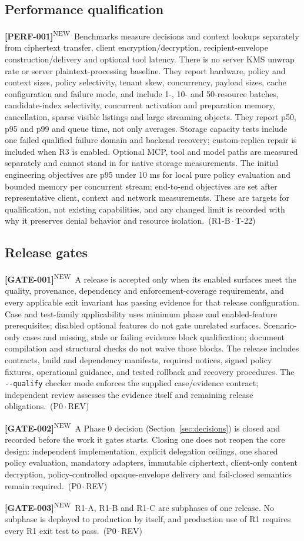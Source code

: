 \documentclass[11pt,a4paper]{article}
\newcommand{\code}[1]{{\small\nolinkurl{#1}}}
\newcommand{\reqtag}[2]{{\footnotesize\color{accent}(#1\,$\cdot$\,#2)}}
\newcommand{\reqn}[4]{\par\noindent\hypertarget{req:#1}{\textbf{[#1]}}\textsuperscript{\color{accent}\tiny NEW}\ #4\ \reqtag{#2}{#3}\par}
\begin{document}
\subsection{Performance qualification}\label{sec:perf}
\reqn{PERF-001}{R1-B}{T-22}{Benchmarks measure decisions and context lookups separately from ciphertext transfer, client encryption/decryption, recipient-envelope construction/delivery and optional tool latency. There is no server KMS unwrap rate or server plaintext-processing baseline. They report hardware, policy and context sizes, policy selectivity, tenant skew, concurrency, payload sizes, cache configuration and failure mode, and include 1-, 10- and 50-resource batches, candidate-index selectivity, concurrent activation and preparation memory, cancellation, sparse visible listings and large streaming objects. They report p50, p95 and p99 and queue time, not only averages. Storage capacity tests include one failed qualified failure domain and backend recovery; custom-replica repair is included when R3 is enabled. Optional MCP, tool and model paths are measured separately and cannot stand in for native storage measurements. The initial engineering objectives are p95 under 10 ms for local pure policy evaluation and bounded memory per concurrent stream; end-to-end objectives are set after representative client, context and network measurements. These are targets for qualification, not existing capabilities, and any changed limit is recorded with why it preserves denial behavior and resource isolation.}

\subsection{Release gates}
\reqn{GATE-001}{P0}{REV}{A release is accepted only when its enabled surfaces meet the quality, provenance, dependency and enforcement-coverage requirements, and every applicable exit invariant has passing evidence for that release configuration. Case and test-family applicability uses minimum phase and enabled-feature prerequisites; disabled optional features do not gate unrelated surfaces. Scenario-only cases and missing, stale or failing evidence block qualification; document compilation and structural checks do not waive those blocks. The release includes contracts, build and dependency manifests, required notices, signed policy fixtures, operational guidance, and tested rollback and recovery procedures. The \code{--qualify} checker mode enforces the supplied case/evidence contract; independent review assesses the evidence itself and remaining release obligations.}
\reqn{GATE-002}{P0}{REV}{A Phase 0 decision (Section~\ref{sec:decisions}) is closed and recorded before the work it gates starts. Closing one does not reopen the core design: independent implementation, explicit delegation ceilings, one shared policy evaluation, mandatory adapters, immutable ciphertext, client-only content decryption, policy-controlled opaque-envelope delivery and fail-closed semantics remain required.}
\reqn{GATE-003}{P0}{REV}{R1-A, R1-B and R1-C are subphases of one release. No subphase is deployed to production by itself, and production use of R1 requires every R1 exit test to pass.}
\end{document}
